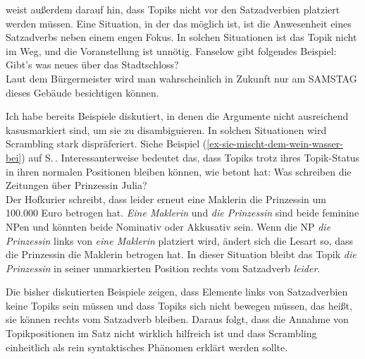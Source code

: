 \citet{Fanselow2006a} weist außerdem darauf hin, dass Topiks nicht vor den Satzadverbien
platziert werden müssen. Eine Situation, in der das möglich ist, ist die Anwesenheit eines Satzadverbs neben einem
engen Fokus. In solchen Situationen ist das Topik nicht im Weg, und die Voranstellung ist
unnötig. Fanselow gibt folgendes Beispiel:
\ea
Gibt's was neues über das Stadtschloss?\\
Laut dem Bürgermeister wird man wahrscheinlich in Zukunft nur am SAMSTAG dieses Gebäude besichtigen können.
\z

\noindent
Ich habe bereits Beispiele diskutiert, in denen die Argumente nicht ausreichend kasusmarkiert sind, um sie
zu disambiguieren. In solchen Situationen wird Scrambling stark dispräferiert. Siehe Beispiel (\ref{ex-sie-mischt-dem-wein-wasser-bei}) auf S.\,\pageref{ex-sie-mischt-dem-wein-wasser-bei}. Interessanterweise bedeutet das,
dass Topiks trotz ihres Topik-Status in ihren normalen Positionen bleiben können, wie \citet[148]{Fanselow2006a}
betont hat:
\ea
Was schreiben die Zeitungen über Prinzessin Julia?\\
Der Hofkurier schreibt, dass leider erneut eine Maklerin die Prinzessin um 100.000 Euro betrogen hat.
\z
\emph{Eine Maklerin} und \emph{die Prinzessin} sind beide feminine NPen und könnten beide Nominativ oder
Akkusativ sein. Wenn die NP \emph{die Prinzessin} links von \emph{eine Maklerin} platziert wird, ändert sich die Lesart so, dass die Prinzessin die
Maklerin betrogen hat. In dieser Situation bleibt das Topik \emph{die Prinzessin} in seiner unmarkierten Position rechts vom
Satzadverb \emph{leider}.

Die bisher diskutierten Beispiele zeigen, dass Elemente links von
Satzadverbien keine Topiks sein müssen und dass Topiks sich nicht bewegen müssen, das heißt, sie können rechts vom
Satzadverb bleiben. Daraus folgt, dass die Annahme von Topikpositionen im Satz nicht
wirklich hilfreich ist und dass Scrambling einheitlich als rein syntaktisches Phänomen erklärt werden sollte.


